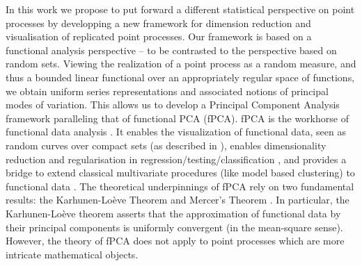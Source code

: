 \documentclass[aos]{imsart}
\theoremstyle{plain}
\theoremstyle{remark}
\newcommand{\1}{1}
\begin{document}
In this work we propose to put forward a different statistical perspective on point processes by developping a new framework for dimension reduction and visualisation of replicated point processes. Our framework is based on a functional analysis perspective -- to be contrasted to the perspective based on random sets. Viewing the realization of a point process as a random measure, and thus a bounded linear functional over an appropriately regular space of functions, we obtain uniform series representations and associated notions of principal modes of variation. This allows us to develop a Principal Component Analysis framework paralleling that of functional PCA (fPCA). fPCA is the workhorse of functional data analysis \cite{LWC13}. It enables the visualization of functional data, seen as random curves over compact sets (as described in \cite{silverman2002applied}), enables dimensionality reduction and regularisation in regression/testing/classification \cite{RO07,delaigle2012componentwise, hilgert2013minimax}, and provides a bridge to extend classical multivariate procedures (like model based clustering) to functional data \cite{EAV04,JP14}. The theoretical underpinnings of fPCA rely on two fundamental results: the Karhunen-Lo\`eve Theorem and  Mercer's Theorem \cite{hsing2015theoretical}. In particular, the Karhunen-Lo\`eve theorem asserts that the approximation of functional data by their principal components is uniformly convergent (in the mean-square sense). However, the theory of fPCA does not apply to point processes which are more intricate mathematical objects.
\end{document}
